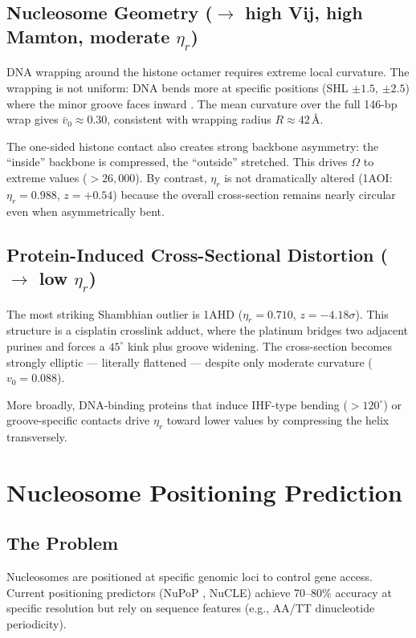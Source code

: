 \subsection{Nucleosome Geometry ($\rightarrow$ high Vij, high Mamton, moderate $\eta_r$)}

DNA wrapping around the histone octamer requires extreme local curvature. The wrapping is not uniform: DNA bends more at specific positions (SHL $\pm 1.5$, $\pm 2.5$) where the minor groove faces inward \citep{Richmond2003}. The mean curvature over the full 146-bp wrap gives $\bar{v}_0 \approx 0.30$, consistent with wrapping radius $R \approx 42$\,\AA.

The one-sided histone contact also creates strong backbone asymmetry: the ``inside'' backbone is compressed, the ``outside'' stretched. This drives $\Omega$ to extreme values ($>26{,}000$). By contrast, $\eta_r$ is not dramatically altered (1AOI: $\eta_r = 0.988$, $z = +0.54$) because the overall cross-section remains nearly circular even when asymmetrically bent.

\subsection{Protein-Induced Cross-Sectional Distortion ($\rightarrow$ low $\eta_r$)}

The most striking Shambhian outlier is 1AHD ($\eta_r = 0.710$, $z = -4.18\sigma$). This structure is a cisplatin crosslink adduct, where the platinum bridges two adjacent purines and forces a $45^\circ$ kink plus groove widening. The cross-section becomes strongly elliptic --- literally flattened --- despite only moderate curvature ($v_0 = 0.088$).

More broadly, DNA-binding proteins that induce IHF-type bending ($> 120^\circ$) or groove-specific contacts drive $\eta_r$ toward lower values by compressing the helix transversely.

\section{Nucleosome Positioning Prediction}

\subsection{The Problem}

Nucleosomes are positioned at specific genomic loci to control gene access. Current positioning predictors (NuPoP \citep{Xi2010}, NuCLE) achieve 70--80\% accuracy at specific resolution but rely on sequence features (e.g., AA/TT dinucleotide periodicity).

